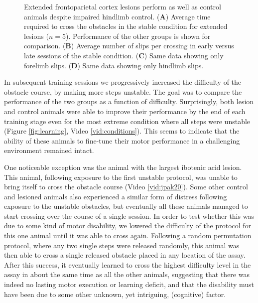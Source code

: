 \begin{figure}
\centering

\caption{Extended frontoparietal cortex lesions perform as well as control animals despite impaired hindlimb control. (\textbf{A}) Average time required to cross the obstacles in the stable condition for extended lesions ($n = 5$). Performance of the other groups is shown for comparison. (\textbf{B}) Average number of slips per crossing in early versus late sessions of the stable condition. (\textbf{C}) Same data showing only forelimb slips. (\textbf{D}) Same data showing only hindlimb slips.}
\label{fig:extendedPerformance}
\end{figure}

In subsequent training sessions we progressively increased the difficulty of the obstacle course, by making more steps unstable. The goal was to compare the performance of the two groups as a function of difficulty. Surprisingly, both lesion and control animals were able to improve their performance by the end of each training stage even for the most extreme condition where all steps were unstable (Figure \ref{fig:learning}, Video \ref{vid:conditions}). This seems to indicate that the ability of these animals to fine-tune their motor performance in a challenging environment remained intact.

One noticeable exception was the animal with the largest ibotenic acid lesion. This animal, following exposure to the first unstable protocol, was unable to bring itself to cross the obstacle course (Video \ref{vid:jpak20}). Some other control and lesioned animals also experienced a similar form of distress following exposure to the unstable obstacles, but eventually all these animals managed to start crossing over the course of a single session. In order to test whether this was due to some kind of motor disability, we lowered the difficulty of the protocol for this one animal until it was able to cross again. Following a random permutation protocol, where any two single steps were released randomly, this animal was then able to cross a single released obstacle placed in any location of the assay. After this success, it eventually learned to cross the highest difficulty level in the assay in about the same time as all the other animals, suggesting that there was indeed no lasting motor execution or learning deficit, and that the disability must have been due to some other unknown, yet intriguing, (cognitive) factor.

